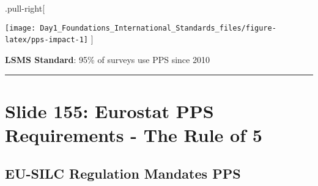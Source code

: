 \documentclass[
]{article}
\newenvironment{Shaded}{\begin{snugshade}}{\end{snugshade}}
\newcommand{\AttributeTok}[1]{\textcolor[rgb]{0.13,0.29,0.53}{#1}}
\newcommand{\CommentTok}[1]{\textcolor[rgb]{0.56,0.35,0.01}{\textit{#1}}}
\newcommand{\DecValTok}[1]{\textcolor[rgb]{0.00,0.00,0.81}{#1}}
\newcommand{\FunctionTok}[1]{\textcolor[rgb]{0.13,0.29,0.53}{\textbf{#1}}}
\newcommand{\NormalTok}[1]{#1}
\newcommand{\OtherTok}[1]{\textcolor[rgb]{0.56,0.35,0.01}{#1}}
\newcommand{\SpecialCharTok}[1]{\textcolor[rgb]{0.81,0.36,0.00}{\textbf{#1}}}
\newcommand{\StringTok}[1]{\textcolor[rgb]{0.31,0.60,0.02}{#1}}
\begin{document}
.pull-right{[}

\texttt{[image: Day1\_Foundations\_International\_Standards\_files/figure-latex/pps-impact-1]}
{]}

\textbf{LSMS Standard}: 95\% of surveys use PPS since 2010

\begin{center}\rule{0.5\linewidth}{0.5pt}\end{center}

\section{Slide 155: Eurostat PPS Requirements - The Rule of
5}\label{slide-155-eurostat-pps-requirements---the-rule-of-5}

\subsection{EU-SILC Regulation Mandates
PPS}\label{eu-silc-regulation-mandates-pps}

\begin{Shaded}
\end{Shaded}
\end{document}
